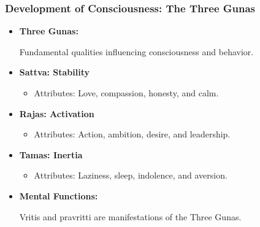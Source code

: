 \begin{frame}[fragile]\frametitle{Development of Consciousness: The Three Gunas}

      \begin{itemize}
        \item \textbf{Three Gunas:}
        
        Fundamental qualities influencing consciousness and behavior.
        
        \item \textbf{Sattva: Stability}
        \begin{itemize}
            \item Attributes: Love, compassion, honesty, and calm.
        \end{itemize}
        \item \textbf{Rajas: Activation}
        \begin{itemize}
            \item Attributes: Action, ambition, desire, and leadership.
        \end{itemize}
        \item \textbf{Tamas: Inertia}
        \begin{itemize}
            \item Attributes: Laziness, sleep, indolence, and aversion.
        \end{itemize}
        \item \textbf{Mental Functions:}
        
        Vritis and pravritti are manifestations of the Three Gunas.
        
      \end{itemize}

\end{frame}


